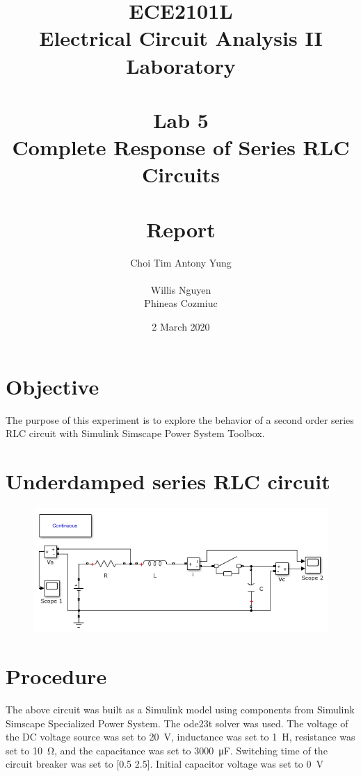 \documentclass{article}
\title{ECE2101L\\Electrical Circuit Analysis II Laboratory\\\,\\Lab 5\\Complete Response of Series RLC Circuits\\\,\\Report\\}
\author{Choi Tim Antony Yung\\\,\\Willis Nguyen\\Phineas Cozmiuc}
\date{2 March 2020}
\begin{document}
\clearpage\maketitle
\thispagestyle{empty}

\newpage
\setcounter{page}{1}

\section*{Objective}
The purpose of this experiment is to explore the behavior of a second order series RLC circuit with Simulink Simscape Power System Toolbox.

\section{Underdamped series RLC circuit}
\begin{figure}[H]
    \centering
        \includegraphics[scale=0.75]{simulink1.png}
\end{figure}

\section*{Procedure}
The above circuit was built as a Simulink model using components from Simulink Simscape Specialized Power System. The ode23t solver was used. The voltage of the DC voltage source was set to \SI{20}{\volt}, inductance was set to \SI{1}{\henry}, resistance was set to \SI{10}{\ohm}, and the capacitance was set to \SI{3000}{\micro\farad}. Switching time of the circuit breaker was set to [0.5 2.5]. Initial capacitor voltage was set to \SI{0}{\volt}
\end{document}
